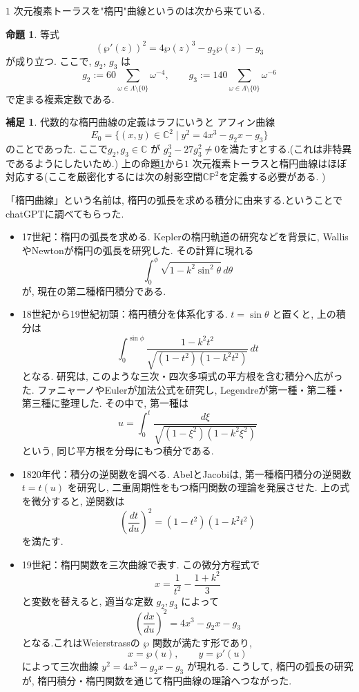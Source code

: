 \documentclass[dvipdfmx,a4paper,11pt]{article} %
\newcommand{\C}{\mathbb{C}}
\theoremstyle{definition}
\numberwithin{equation}{section}
\newtheorem{prop}[thm]{命題}
\newtheorem{rem}[thm]{補足}
\begin{document}
$1$ 次元複素トーラスを"楕円"曲線というのは次から来ている. 
\begin{prop}\label{O-M147}
等式
\[
(\wp'(z))^2=4\wp(z)^3-g_2\wp(z)-g_3
\]
が成り立つ. ここで, $g_2$, $g_3$ は
\[
g_2:=60\sum_{\omega\in\Lambda\setminus\{0\}}\omega^{-4},
\qquad
g_3:=140\sum_{\omega\in\Lambda\setminus\{0\}}\omega^{-6}
\]
で定まる複素定数である.
\end{prop}

\begin{rem}
代数的な楕円曲線の定義はラフにいうと
アフィン曲線
\[
E_0=\{(x,y)\in\C^2\mid y^2=4x^3-g_2x-g_3\}
\]
のことであった. ここで$g_2,g_3\in\C$ が
\(
g_2^3-27g_3^2\neq0
\)を満たすとする.(これは非特異であるようにしたいため.)
上の命題\ref{O-M147}から$1$ 次元複素トーラスと楕円曲線はほぼ対応する(ここを厳密化するには次の射影空間$\C\mathbb P^2$を定義する必要がある. )

「楕円曲線」という名前は, 楕円の弧長を求める積分に由来する.ということでchatGPTに調べてもらった.

\begin{itemize}
\item

17世紀：楕円の弧長を求める.
Keplerの楕円軌道の研究などを背景に, 
WallisやNewtonが楕円の弧長を研究した.
その計算に現れる
\[
\int_0^\phi\sqrt{1-k^2\sin^2\theta}\,d\theta
\]
が, 現在の第二種楕円積分である.

\item

18世紀から19世紀初頭：楕円積分を体系化する.
$t=\sin\theta$ と置くと, 上の積分は
\[
\int_0^{\sin\phi}
\frac{1-k^2t^2}{\sqrt{(1-t^2)(1-k^2t^2)}}\,dt
\]
となる.
研究は, このような三次・四次多項式の平方根を含む積分へ広がった.
ファニャーノやEulerが加法公式を研究し, 
Legendreが第一種・第二種・第三種に整理した.
その中で, 第一種は
\[
u=\int_0^t\frac{d\xi}{\sqrt{(1-\xi^2)(1-k^2\xi^2)}}
\]
という, 同じ平方根を分母にもつ積分である.

\item

1820年代：積分の逆関数を調べる.
AbelとJacobiは, 第一種楕円積分の逆関数 $t=t(u)$ を研究し, 
二重周期性をもつ楕円関数の理論を発展させた.
上の式を微分すると, 逆関数は
\[
\left(\frac{dt}{du}\right)^2=(1-t^2)(1-k^2t^2)
\]
を満たす.

\item

19世紀：楕円関数を三次曲線で表す.
この微分方程式で
\[
x=\frac1{t^2}-\frac{1+k^2}{3}
\]
と変数を替えると, 適当な定数 $g_2,g_3$ によって
\[
\left(\frac{dx}{du}\right)^2=4x^3-g_2x-g_3
\]
となる.これはWeierstrassの $\wp$ 関数が満たす形であり, 
\[
x=\wp(u),\qquad y=\wp'(u)
\]
によって三次曲線 $y^2=4x^3-g_2x-g_3$ が現れる.
こうして, 楕円の弧長の研究が, 
楕円積分・楕円関数を通じて楕円曲線の理論へつながった.
\end{itemize}

\end{rem}
\end{document}
